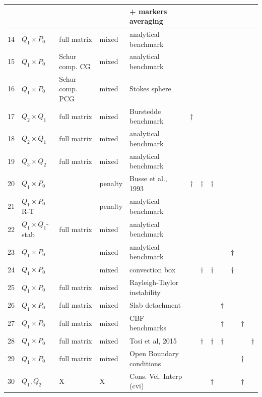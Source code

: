 \documentclass[a4paper]{article}
\begin{document}
{\begin{tabular}{|p{0.4cm}||p{1.9cm}p{2.6cm}p{1.5cm}p{4.1cm}|p{0.2cm}|p{0.2cm}|p{0.2cm}|p{0.2cm}|p{0.2cm}|p{0.2cm}|p{0.2cm}|}
   &                  &              &         & + markers averaging         &   &       &        & &&\\
\hline
14 & $Q_1 \times P_0$ & full matrix & mixed   & analytical benchmark        &  &       &        & & &\\ 
\hline
15 & $Q_1 \times P_0$ & Schur comp. CG & mixed   & analytical benchmark        &  &       &        & &&\\ 
\hline
16 & $Q_1 \times P_0$ & Schur comp. PCG & mixed   & Stokes sphere               &  &       &        & &&\\ 
\hline
17 & $Q_2 \times Q_1$ & full matrix & mixed   & Burstedde benchmark         & $\dag$ &       &        & &&\\ 
\hline
18 & $Q_2 \times Q_1$ & full matrix & mixed   & analytical benchmark        &  &       &        & &&\\ 
\hline
19 & $Q_3 \times Q_2$ & full matrix & mixed   & analytical benchmark        &  &       &        & &&\\ 
\hline
20 & $Q_1 \times P_0$ &              & penalty & Busse et al., 1993            & $\dag$ & $\dag$& $\dag$ & & &\\ 
\hline
21 & $Q_1 \times P_0$ R-T  &              & penalty & analytical benchmark        &  &       &        & &&\\ 
\hline
22 & $Q_1 \times Q_1$-stab & full matrix  & mixed & analytical benchmark    &  &       &        & &&\\ 
\hline
23 & $Q_1 \times P_0$ &              & mixed  & analytical benchmark         &  &       &        & & $\dag$ &\\ 
\hline
24 & $Q_1 \times P_0$ &              & mixed  & convection box               &  & $\dag$& $\dag$ & & $\dag$ &\\
\hline
25 & $Q_1 \times P_0$ & full matrix & mixed  & Rayleigh-Taylor instability  &  &       &        & & &\\ 
\hline
26 & $Q_1 \times P_0$ & full matrix & mixed  & Slab detachment              &  &       &        & $\dag$ & &\\ 
\hline
27 & $Q_1 \times P_0$ & full matrix & mixed  & CBF benchmarks               &  &       &        & $\dag$ &  & $\dag$\\ 
\hline
28 & $Q_1 \times P_0$ & full matrix & mixed  & Tosi et al, 2015             &  &  $\dag$     &  $\dag$  & $\dag$ & & &$\dag$\\ 
\hline
29 & $Q_1 \times P_0$ & full matrix & mixed  & Open Boundary conditions     &  &       & & & &  $\dag$ & \\
\hline
30 & $Q_1,Q_2$        &       X     &   X    & Cons. Vel. Interp (cvi)    & & & $\dag$ & & & $\dag$ & \\
\hline
\hline
\end{tabular}
}
\end{document}
